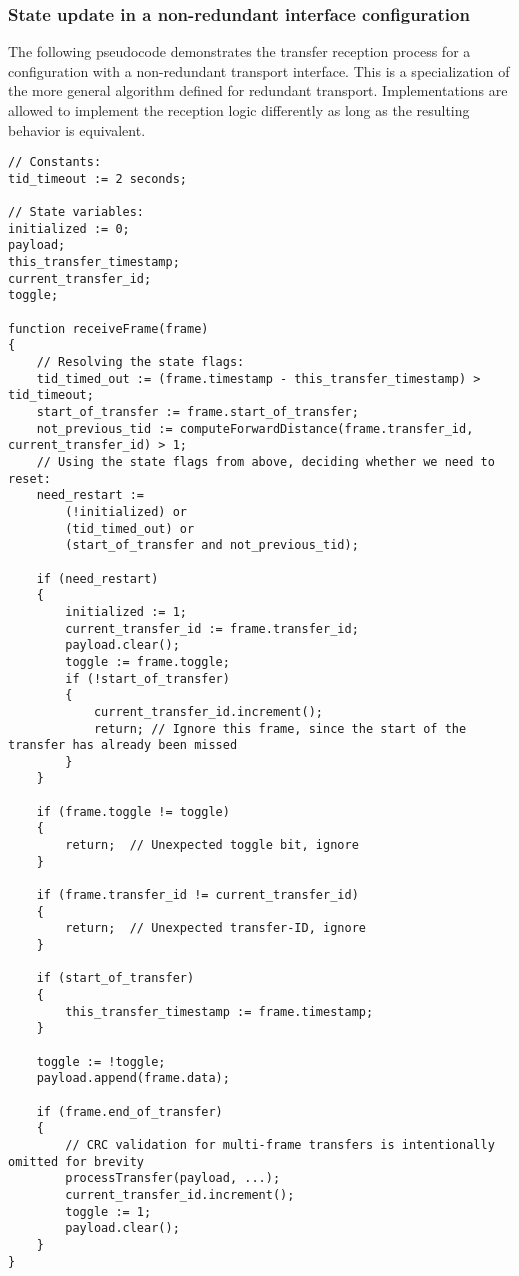 \clearpage
\subsubsection{State update in a non-redundant interface configuration}
\label{sec:transfer_reception_state_update_non_redundant}

The following pseudocode demonstrates the transfer reception process for a configuration
with a non-redundant transport interface.
This is a specialization of the more general algorithm defined for redundant transport.
Implementations are allowed to implement the reception logic differently as long as the resulting
behavior is equivalent.

\begin{verbatim}
// Constants:
tid_timeout := 2 seconds;

// State variables:
initialized := 0;
payload;
this_transfer_timestamp;
current_transfer_id;
toggle;

function receiveFrame(frame)
{
    // Resolving the state flags:
    tid_timed_out := (frame.timestamp - this_transfer_timestamp) > tid_timeout;
    start_of_transfer := frame.start_of_transfer;
    not_previous_tid := computeForwardDistance(frame.transfer_id, current_transfer_id) > 1;
    // Using the state flags from above, deciding whether we need to reset:
    need_restart :=
        (!initialized) or
        (tid_timed_out) or
        (start_of_transfer and not_previous_tid);

    if (need_restart)
    {
        initialized := 1;
        current_transfer_id := frame.transfer_id;
        payload.clear();
        toggle := frame.toggle;
        if (!start_of_transfer)
        {
            current_transfer_id.increment();
            return; // Ignore this frame, since the start of the transfer has already been missed
        }
    }

    if (frame.toggle != toggle)
    {
        return;  // Unexpected toggle bit, ignore
    }

    if (frame.transfer_id != current_transfer_id)
    {
        return;  // Unexpected transfer-ID, ignore
    }

    if (start_of_transfer)
    {
        this_transfer_timestamp := frame.timestamp;
    }

    toggle := !toggle;
    payload.append(frame.data);

    if (frame.end_of_transfer)
    {
        // CRC validation for multi-frame transfers is intentionally omitted for brevity
        processTransfer(payload, ...);
        current_transfer_id.increment();
        toggle := 1;
        payload.clear();
    }
}
\end{verbatim}
\clearpage

